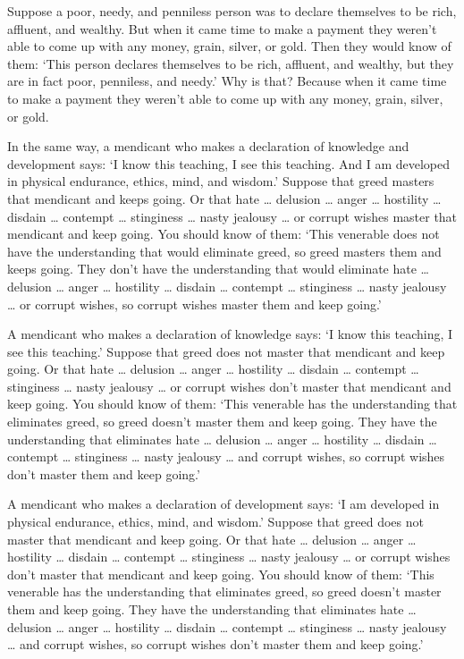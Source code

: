 \documentclass[12pt,openany]{book}%
\begin{document}
Suppose a poor, needy, and penniless person was to declare themselves to be rich, affluent, and wealthy. But when it came time to make a payment they weren’t able to come up with any money, grain, silver, or gold. Then they would know of them: ‘This person declares themselves to be rich, affluent, and wealthy, but they are in fact poor, penniless, and needy.’ Why is that? Because when it came time to make a payment they weren’t able to come up with any money, grain, silver, or gold. 

In the same way, a mendicant who makes a declaration of knowledge and development says: ‘I know this teaching, I see this teaching. And I am developed in physical endurance, ethics, mind, and wisdom.’ Suppose that greed masters that mendicant and keeps going. Or that hate … delusion … anger … hostility … disdain … contempt … stinginess … nasty jealousy … or corrupt wishes master that mendicant and keep going. You should know of them: ‘This venerable does not have the understanding that would eliminate greed, so greed masters them and keeps going. They don’t have the understanding that would eliminate hate … delusion … anger … hostility … disdain … contempt … stinginess … nasty jealousy … or corrupt wishes, so corrupt wishes master them and keep going.’ 

A mendicant who makes a declaration of knowledge says: ‘I know this teaching, I see this teaching.’ Suppose that greed does not master that mendicant and keep going. Or that hate … delusion … anger … hostility … disdain … contempt … stinginess … nasty jealousy … or corrupt wishes don’t master that mendicant and keep going. You should know of them: ‘This venerable has the understanding that eliminates greed, so greed doesn’t master them and keep going. They have the understanding that eliminates hate … delusion … anger … hostility … disdain … contempt … stinginess … nasty jealousy … and corrupt wishes, so corrupt wishes don’t master them and keep going.’ 

A mendicant who makes a declaration of development says: ‘I am developed in physical endurance, ethics, mind, and wisdom.’ Suppose that greed does not master that mendicant and keep going. Or that hate … delusion … anger … hostility … disdain … contempt … stinginess … nasty jealousy … or corrupt wishes don’t master that mendicant and keep going. You should know of them: ‘This venerable has the understanding that eliminates greed, so greed doesn’t master them and keep going. They have the understanding that eliminates hate … delusion … anger … hostility … disdain … contempt … stinginess … nasty jealousy … and corrupt wishes, so corrupt wishes don’t master them and keep going.’ 
\end{document}
